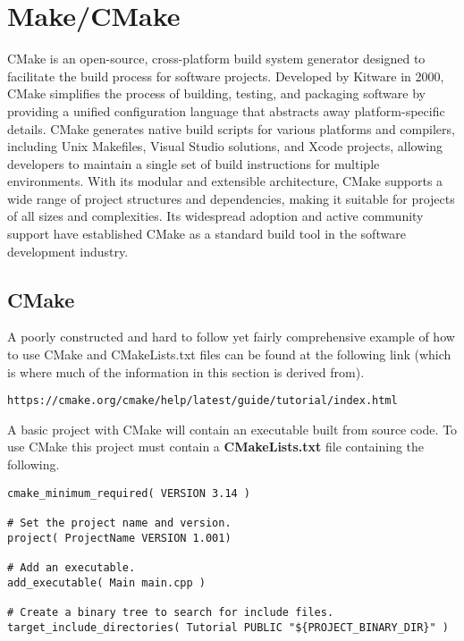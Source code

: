 \chapter{Make/CMake}
\thispagestyle{fancy}
\lstset{}\lstset{language=make, style=makestyle}

CMake is an open-source, cross-platform build system generator designed to facilitate the build process for software projects. Developed by Kitware in 2000, CMake simplifies the process of building, testing, and packaging software by providing a unified configuration language that abstracts away platform-specific details. CMake generates native build scripts for various platforms and compilers, including Unix Makefiles, Visual Studio solutions, and Xcode projects, allowing developers to maintain a single set of build instructions for multiple environments. With its modular and extensible architecture, CMake supports a wide range of project structures and dependencies, making it suitable for projects of all sizes and complexities. Its widespread adoption and active community support have established CMake as a standard build tool in the software development industry.

\section{CMake}

A poorly constructed and hard to follow yet fairly comprehensive example of how to use CMake and CMakeLists.txt files can be found at the following link (which is where much of the information in this section is derived from).
\begin{lstlisting}
https://cmake.org/cmake/help/latest/guide/tutorial/index.html
\end{lstlisting}

A basic project with CMake will contain an executable built from source code. To use CMake this project must contain a \textbf{CMakeLists.txt} file containing the following.
\begin{lstlisting}
cmake_minimum_required( VERSION 3.14 )

# Set the project name and version.
project( ProjectName VERSION 1.001)

# Add an executable.
add_executable( Main main.cpp )

# Create a binary tree to search for include files.
target_include_directories( Tutorial PUBLIC "${PROJECT_BINARY_DIR}" )
\end{lstlisting}

